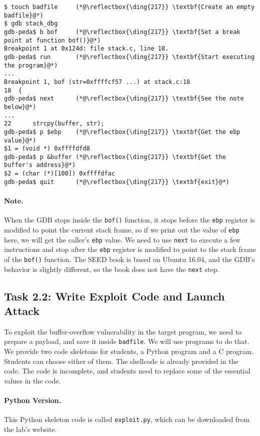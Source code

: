 \begin{lstlisting}
$ touch badfile     (*@\reflectbox{\ding{217}} \textbf{Create an empty badfile}@*)
$ gdb stack_dbg
gdb-peda$ b bof     (*@\reflectbox{\ding{217}} \textbf{Set a break point at function bof()}@*)
Breakpoint 1 at 0x124d: file stack.c, line 18.
gdb-peda$ run       (*@\reflectbox{\ding{217}} \textbf{Start executing the program}@*)
...
Breakpoint 1, bof (str=0xffffcf57 ...) at stack.c:18
18  {
gdb-peda$ next      (*@\reflectbox{\ding{217}} \textbf{See the note below}@*)
...
22	    strcpy(buffer, str);
gdb-peda$ p $ebp    (*@\reflectbox{\ding{217}} \textbf{Get the ebp value}@*)
$1 = (void *) 0xffffdfd8   
gdb-peda$ p &buffer (*@\reflectbox{\ding{217}} \textbf{Get the buffer's address}@*)
$2 = (char (*)[100]) 0xffffdfac
gdb-peda$ quit      (*@\reflectbox{\ding{217}} \textbf{exit}@*)
\end{lstlisting}

\paragraph{Note.} When the GDB stops inside the \texttt{bof()} function, it 
stops before the \texttt{ebp} register is modified
to point the current stack frame, so if we print out the value of 
\texttt{ebp} here, we will get the caller's \texttt{ebp} value. We need to use 
\texttt{next} to execute a few instructions and stop 
after the \texttt{ebp} register is modified to point to the stack
frame of the \texttt{bof()} function. 
The SEED book is based on Ubuntu 16.04, and the GDB's behavior is slightly
different, so the book does not have the \texttt{next} step. 

\subsection{Task 2.2: Write Exploit Code and Launch Attack} 

To exploit the buffer-overflow vulnerability in the target program,
we need to prepare a payload, and save it inside \texttt{badfile}. 
We will use programs to do that.
We provide two code skeletons for students, a Python program and a C program.
Students can choose either of them. 
The shellcode is already provided in the code. 
The code is incomplete, and students need to replace some of the essential 
values in the code. 

\paragraph{Python Version.} This Python skeleton code 
is called \texttt{exploit.py}, which
can be downloaded from the lab's website.

